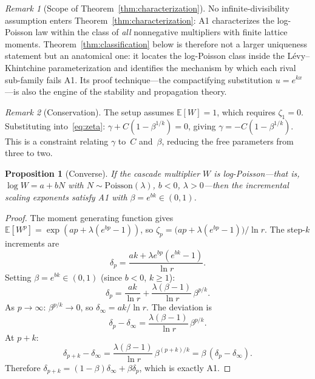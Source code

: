 \documentclass[12pt]{amsart}
\newtheorem{proposition}[theorem]{Proposition}
\theoremstyle{definition}
\theoremstyle{remark}
\newtheorem*{remark}{Remark}
\begin{document}
\begin{remark}[Scope of Theorem~\ref{thm:characterization}]
No infinite-divisibility assumption enters
Theorem~\ref{thm:characterization}: A1 characterizes the log-Poisson
law within the class of \emph{all} nonnegative multipliers with
finite lattice moments.  Theorem~\ref{thm:classification} below is
therefore not a larger uniqueness statement but an anatomical one:
it locates the log-Poisson class inside the L\'evy--Khintchine
parameterization and identifies the mechanism by which each rival
sub-family fails A1.  Its proof technique---the compactifying
substitution $u = e^{kx}$---is also the engine of the stability and
propagation theory.
\end{remark}

\begin{remark}[Conservation]
The setup assumes $\mathbb{E}[W] = 1$, which requires $\zeta_1 = 0$.
Substituting into~\eqref{eq:zeta}: $\gamma + C(1 - \beta^{1/k}) =
0$, giving $\gamma = -C(1-\beta^{1/k})$.  This is a constraint
relating $\gamma$ to~$C$ and~$\beta$, reducing the free parameters
from three to two.
\end{remark}


\begin{proposition}[Converse]\label{prop:converse}
If the cascade multiplier $W$ is log-Poisson---\allowbreak that is,
$\log W = a + bN$ with $N \sim \mathrm{Poisson}(\lambda)$, $b < 0$, $\lambda >
0$---then the incremental scaling exponents satisfy A1 with $\beta =
e^{bk} \in (0,1)$.
\end{proposition}

\begin{proof}
The moment generating function gives $\mathbb{E}[W^p] = \exp(ap +
\lambda(e^{bp} - 1))$, so $\zeta_p = \bigl(ap + \lambda(e^{bp} -
1)\bigr)/\ln r$.  The step-$k$ increments are
\[
  \delta_p = \frac{ak + \lambda e^{bp}(e^{bk}-1)}{\ln r}.
\]
Setting $\beta = e^{bk} \in (0,1)$ (since $b < 0$, $k \geq 1$):
\[
  \delta_p = \frac{ak}{\ln r}
  + \frac{\lambda(\beta - 1)}{\ln r}\,\beta^{p/k}.
\]
As $p \to \infty$: $\beta^{p/k} \to 0$, so $\delta_\infty = ak/\ln
r$.  The deviation is
\[
  \delta_p - \delta_\infty
  = \frac{\lambda(\beta - 1)}{\ln r}\,\beta^{p/k}.
\]
At $p + k$:
\[
  \delta_{p+k} - \delta_\infty
  = \frac{\lambda(\beta-1)}{\ln r}\,\beta^{(p+k)/k}
  = \beta\,(\delta_p - \delta_\infty).
\]
Therefore $\delta_{p+k} = (1-\beta)\delta_\infty + \beta\delta_p$,
which is exactly A1.
\end{proof}
\end{document}
